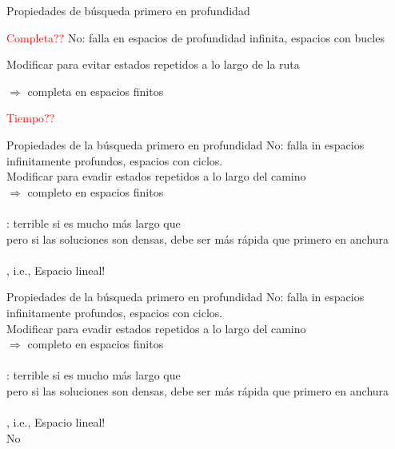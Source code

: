 \documentclass{beamer}
\theoremstyle{definition}
\theoremstyle{theorem}
\theoremstyle{remark}
\begin{document}

\begin{frame}{Propiedades de búsqueda primero en profundidad}

  
    \textcolor{red}{Completa??} No: falla en espacios de profundidad infinita, espacios con bucles
    
    \quad \quad \quad Modificar para evitar estados repetidos a lo largo de la ruta
    
    \quad \quad \quad \quad \quad $\Rightarrow$ completa en espacios finitos
    \bigskip
    
    \textcolor{red}{Tiempo??}
    
\end{frame}

\begin{frame}{Propiedades de la b\'usqueda primero en profundidad}
     No: falla in espacios infinitamente profundos, espacios con ciclos.\\
    \quad Modificar para evadir estados repetidos a lo largo del camino\\
    \quad $\Rightarrow$ completo en espacios finitos\\~\\
    
    : terrible si  es mucho m\'as largo que \\
    \quad pero si las soluciones son densas, debe ser m\'as r\'apida que primero en anchura\\~\\
    
    , i.e., Espacio lineal!\\

\end{frame}


\begin{frame}{Propiedades de la b\'usqueda primero en profundidad}
     No: falla in espacios infinitamente profundos, espacios con ciclos.\\
    \quad Modificar para evadir estados repetidos a lo largo del camino\\
    \quad $\Rightarrow$ completo en espacios finitos\\~\\
    
    : terrible si  es mucho m\'as largo que \\
    \quad pero si las soluciones son densas, debe ser m\'as r\'apida que primero en anchura\\~\\
    
    , i.e., Espacio lineal!\\
     No

\end{frame}
\end{document}
